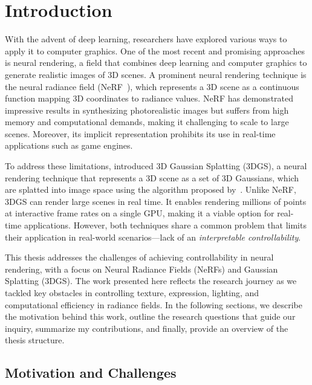 

\chapter{Introduction}
\label{chap:introduction}

With the advent of deep learning, researchers have explored various ways to
apply it to computer graphics.
One of the most recent and promising approaches is neural rendering, a field
that combines deep learning and computer graphics to generate realistic images
of 3D scenes.
A prominent neural rendering technique is the neural radiance field
(NeRF~\cite{mildenhall2020nerf}), which represents a 3D scene as a continuous
function mapping 3D coordinates to radiance values.
NeRF has demonstrated impressive results in synthesizing photorealistic images
but suffers from high memory and computational demands, making it challenging
to scale to large scenes.
Moreover, its implicit representation prohibits its use in real-time
applications such as game engines.

To address these limitations, \textcite{kerbl20233d} introduced 3D Gaussian
Splatting (3DGS), a neural rendering technique that represents a 3D scene as a
set of 3D Gaussians, which are splatted into image space using the algorithm
proposed by~\textcite{zwicker2001ewa}.
Unlike NeRF, 3DGS can render large scenes in real time.
It enables rendering millions of points at interactive frame rates on a single
GPU, making it a viable option for real-time applications.
However, both techniques share a common problem that limits their application
in real-world scenarios---lack of an \textit{interpretable controllability}.

This thesis addresses the challenges of achieving controllability in neural
rendering, with a focus on Neural Radiance Fields (NeRFs) and Gaussian
Splatting (3DGS).
The work presented here reflects the research journey as we tackled key
obstacles in controlling texture, expression, lighting, and computational
efficiency in radiance fields.
In the following sections, we describe the motivation behind this work,
outline the research questions that guide our inquiry, summarize my
contributions, and finally, provide an overview of the thesis structure.

\section{Motivation and Challenges}
  \thesisteaserfigure

